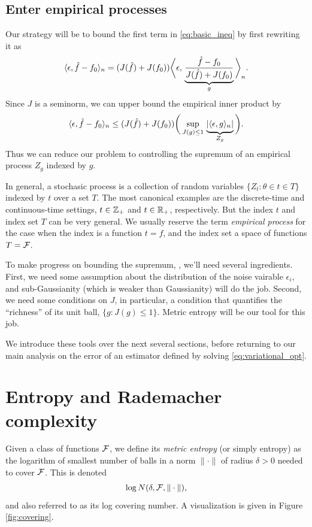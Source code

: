 \documentclass{article}
\begin{document}
\subsection{Enter empirical processes}

Our strategy will be to bound the first term in \eqref{eq:basic_ineq} by first
rewriting it as  
\[
\langle \epsilon, \hat{f}-f_0 \rangle_n = (J(\hat{f})  +J(f_0)) 
\bigg\langle \epsilon, \, \underbrace{\frac{\hat{f}-f_0}{J(\hat{f})+J(f_0)}}_{g}
\bigg\rangle_n.  
\]
Since $J$ is a seminorm, we can upper bound the empirical inner product by    
\[
\langle \epsilon, \hat{f}-f_0 \rangle_n \leq (J(\hat{f}) + J(f_0)) 
\bigg( \sup_{J(g) \leq 1} \, \underbrace{|\langle \epsilon, g
  \rangle_n| \vphantom{\big|}}_{Z_g} \bigg).
\]
Thus we can reduce our problem to controlling the supremum of an empirical
process $Z_g$ indexed by $g$.  

In general, a stochasic process is a collection of random variables $\{Z_t :
\theta \in t \in T\}$ indexed by $t$ over a set $T$. The most canonical examples
are the discrete-time and continuous-time settings, $t \in \mathbb{Z}_+$ and $t \in 
\mathbb{R}_+$, respectively. But the index $t$ and index set $T$ can be very general. We
usually reserve the term \emph{empirical process} for the case when the index is
a function $t=f$, and the index set a space of functions $T=\mathcal{F}$.   

To make progress on bounding the supremum, ,
we'll need several ingredients. First, we need some assumption about the
distribution of the noise vairable $\epsilon_i$, and sub-Gaussianity (which is
weaker than Gaussianity) will do the job. Second, we need some conditions on
$J$, in particular, a condition that quantifies the ``richness'' of its unit
ball, $\{g : J(g) \leq 1\}$. Metric entropy will be our tool for this job.                

We introduce these tools over the next several sections, before returning to our
main analysis on the error of an estimator \smash{$\hf$} defined by solving 
\eqref{eq:variational_opt}.  

\section{Entropy and Rademacher complexity} 

\def\Rad{\mathrm{Rad}}
\def\diam{\mathrm{diam}}

Given a class of functions $\mathcal{F}$, we define its \emph{metric entropy} (or simply   
entropy) as the logarithm of smallest number of balls in a norm $\|\cdot\|$ of
radius $\delta>0$ needed to cover $\mathcal{F}$. This is denoted     
\[
\log N(\delta, \mathcal{F}, \|\cdot\|), 
\]
and also referred to as its log covering number. A visualization is given in
Figure \ref{fig:covering}.
\end{document}
